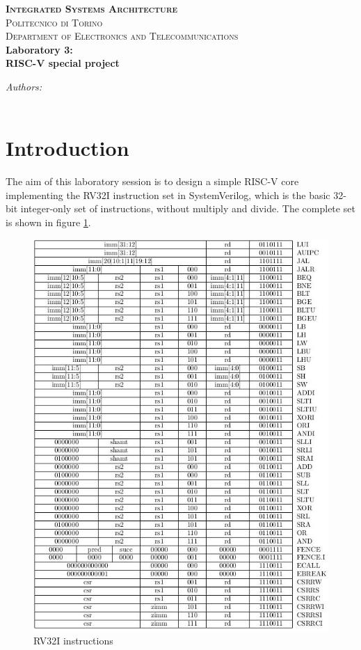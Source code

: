\documentclass[a4paper]{article}
\author{Marco Andorno (247222)\\ Michele Caon (253027) \\ Alessio Colucci (251197) \\ Matteo Perotti (251453)}
\begin{document}
\begin{center}
\thispagestyle{empty}


\textbf{\textsc{\Large Integrated Systems Architecture}}\\[1.0cm] 
\textsc{\Large Politecnico di Torino}\\[0.5cm] 
\textsc{\large Department of Electronics and Telecommunications
}\\[1cm] 


\huge \textbf{Laboratory 3: \\ RISC-V special project}

\end{center}


\vfill
\large
\begin{flushleft}
\makeatletter
\emph{Authors:}\\
\@author \\
\vspace{1cm}
\normalsize \@date
\makeatother
\end{flushleft} 

\newpage
\tableofcontents
\newpage

\section{Introduction}
The aim of this laboratory session is to design a simple RISC-V core implementing the RV32I instruction set in SystemVerilog, which is the basic 32-bit integer-only set of instructions, without multiply and divide. The complete set is shown in figure \ref{fig:rv32i}.

\begin{figure}[hbtp]
    \centering
    \includegraphics[width=.8\textwidth]{img/RISCV_RV32I_instr2.jpg}
    \caption{RV32I instructions}
    \label{fig:rv32i}
\end{figure}
\end{document}

